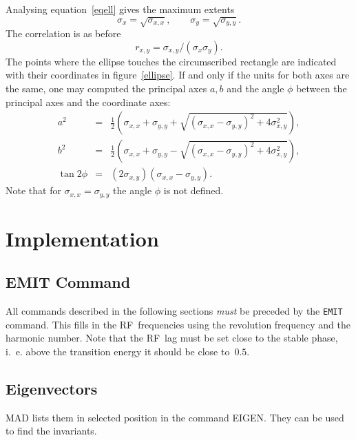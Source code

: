 Analysing equation~\ref{eqell} gives the maximum extents
\begin{equation}
\sigma_x = \sqrt{\sigma_{x,x}}, \qquad
\sigma_y = \sqrt{\sigma_{y,y}}.
\end{equation}
The correlation is as before
\begin{equation}
r_{x,y} = \sigma_{x,y} / (\sigma_{x} \sigma_{y}).
\end{equation}
The points where the ellipse touches the circumscribed rectangle are
indicated with their coordinates in figure~\ref{ellipse}.
If and only if the units for both axes are the same,
one may computed the principal axes $a,b$  and the angle $\phi$
between the principal axes and the coordinate axes:
\begin{equation}\begin{array}{ccl}
a^2 &=& \frac{1}{2} \left( \sigma_{x,x} + \sigma_{y,y} +
        \sqrt{(\sigma_{x,x} - \sigma_{y,y})^2 + 4 \sigma_{x,y}^2}\right), \\
b^2 &=& \frac{1}{2} \left( \sigma_{x,x} + \sigma_{y,y} -
        \sqrt{(\sigma_{x,x} - \sigma_{y,y})^2 + 4 \sigma_{x,y}^2}\right), \\
\tan 2\phi &=& (2 \sigma_{x,y}) (\sigma_{x,x} - \sigma_{y,y}).
\end{array}\end{equation}
Note that for $\sigma_{x,x} = \sigma_{y,y}$ the angle $\phi$ is not
defined.
 
 
\section{Implementation}
 
\subsection{EMIT Command}
All commands described in the following sections {\em must} be
preceded by the {\tt EMIT} command.
This fills in the RF~frequencies using the revolution frequency and
the harmonic number.
Note that the RF~lag must be set close to the stable phase,
i.~e. above the transition energy it should be close to~$0.5$.
 
\subsection{Eigenvectors}
MAD lists them in selected position in the command EIGEN.
They can be used to find the invariants.
 
